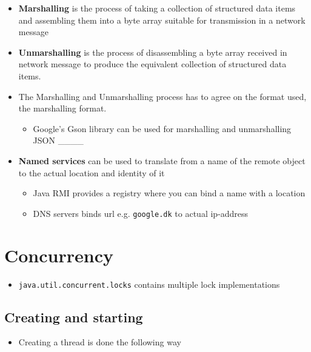 \documentclass[11pt]{article}
\providecommand{\tightlist}{%
      \setlength{\itemsep}{0pt}\setlength{\parskip}{0pt}}
\begin{document}
\begin{itemize}
\tightlist
\item
  \textbf{Marshalling} is the process of taking a collection of
  structured data items and assembling them into a byte array suitable
  for transmission in a network message
\item
  \textbf{Unmarshalling} is the process of disassembling a byte array
  received in network message to produce the equivalent collection of
  structured data items.
\item
  The Marshalling and Unmarshalling process has to agree on the format
  used, the marshalling format.

  \begin{itemize}
  \tightlist
  \item
    Google's Gson library can be used for marshalling and unmarshalling
    JSON \_\_\_\_
  \end{itemize}
\item
  \textbf{Named services} can be used to translate from a name of the
  remote object to the actual location and identity of it

  \begin{itemize}
  \tightlist
  \item
    Java RMI provides a registry where you can bind a name with a
    location
  \item
    DNS servers binds url e.g. \texttt{google.dk} to actual ip-address
  \end{itemize}
\end{itemize}

    \hypertarget{concurrency}{%
\section{Concurrency}\label{concurrency}}

\begin{itemize}
\tightlist
\item
  \texttt{java.util.concurrent.locks} contains multiple lock
  implementations
\end{itemize}

\hypertarget{creating-and-starting}{%
\subsection{Creating and starting}\label{creating-and-starting}}

\begin{itemize}
\tightlist
\item
  Creating a thread is done the following way
\end{itemize}
\end{document}
